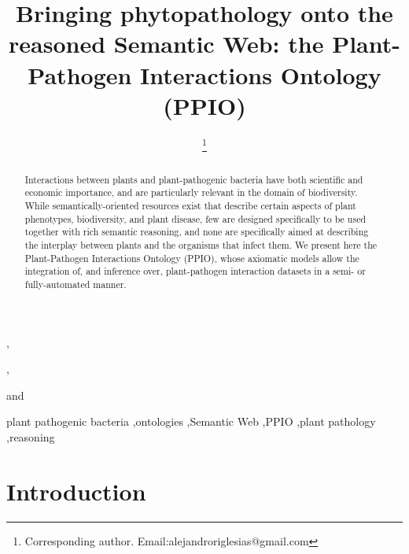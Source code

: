 \documentclass[sw]{iosart2c}
\begin{document}
\begin{frontmatter}

\title{Bringing phytopathology onto the reasoned Semantic Web: the Plant-Pathogen Interactions Ontology (PPIO)}
\runningtitle{}




\author[A]{ \thanks{Corresponding author. Email:alejandroriglesias@gmail.com}},
\author[A]{ },
\author[A]{ } and
\author[A]{ }
\runningauthor{}
\address[A]{Biological Informatics Group, Centre for Plant Biotechnology and Genomics (CBGP), Technical University of Madrid (UPM), Spain}

\begin{abstract}
Interactions between plants and plant-pathogenic bacteria have both scientific and economic importance, and are particularly relevant in the domain of biodiversity. While semantically-oriented resources exist that describe certain aspects of plant phenotypes, biodiversity, and plant disease, few are designed specifically to be used together with rich semantic reasoning, and none are specifically aimed at describing the interplay between plants and the organisms that infect them.  We present here the Plant-Pathogen Interactions Ontology (PPIO), whose axiomatic models allow the integration of, and inference over, plant-pathogen interaction datasets in a semi- or fully-automated manner.
\end{abstract}

\begin{keyword}
 plant pathogenic bacteria \sep ontologies \sep Semantic Web \sep PPIO \sep plant pathology \sep reasoning
\end{keyword}

\end{frontmatter}


\section{Introduction}\label{s1}
\end{document}
